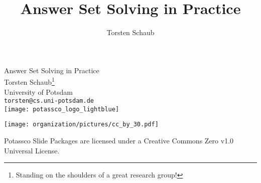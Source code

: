 \title{Answer Set Solving in Practice}
\author{Torsten Schaub}
\begin{frame}[c]
  \bigskip
  \vfill
  \begin{center}%
    \alert{\huge Answer Set Solving in Practice}
    \bigskip
    \bigskip
    \\
    Torsten Schaub\footnote{Standing on the shoulders of a great research group!}\\
    University of Potsdam\\
    \texttt{torsten@cs.uni-potsdam.de}\\
    \bigskip
    \texttt{[image: potassco\_logo\_lightblue]}
  \end{center}
  \bigskip
  \begin{center}
    \texttt{[image: organization/pictures/cc\_by\_30.pdf]} %
    \par
    {\tiny Potassco Slide Packages are licensed under a Creative Commons Zero v1.0 Universal License.}
  \end{center}
\end{frame}
%
